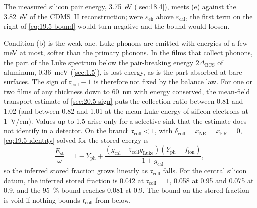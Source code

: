 The measured silicon pair energy, \SI{3.75}{eV} (\cref{sec:18.4}), meets (e) against the \SI{3.82}{eV} of the CDMS~II reconstruction; were $\varepsilon_{\mathrm{eh}}$ above $\varepsilon_{\mathrm{cal}}$, the first term on the right of \cref{eq:19.5-bound} would turn negative and the bound would loosen.

Condition (b) is the weak one. Luke phonons are emitted with energies of a few meV at most, softer than the primary phonons. In the films that collect phonons, the part of the Luke spectrum below the pair-breaking energy $2\Delta_{\mathrm{BCS}}$ of aluminum, \SI{0.36}{meV} (\cref{sec:1.5}), is lost energy, as is the part absorbed at bare surfaces. The sign of $\mathfrak{r}_{\mathrm{coll}} - 1$ is therefore not fixed by the balance law. For one or two films of any thickness down to \SI{60}{nm} with energy conserved, the mean-field transport estimate of \cref{sec:20.5-sign} puts the collection ratio between 0.81 and 1.02 (and between 0.82 and 1.01 at the mean Luke energy of silicon electrons at \SI{1}{V/cm}). Values up to 1.5 arise only for a selective sink that the estimate does not identify in a detector. On the branch $\mathfrak{r}_{\mathrm{coll}} < 1$, with $\delta_{\mathrm{coll}} = x_{\mathrm{NR}} = x_{\mathrm{ER}} = 0$, \cref{eq:19.5-identity} solved for the stored energy is
\begin{equation}
  \frac{E_{\mathrm{st}}}{\omega} = 1 - Y_{\mathrm{ph}} + \frac{(g_{\mathrm{cal}} - \mathfrak{r}_{\mathrm{coll}}g_{\mathrm{Luke}})(Y_{\mathrm{ph}} - f_{\mathrm{ion}})}{1 + g_{\mathrm{cal}}} ,
  \label{eq:19.5-widen}
\end{equation}
so the inferred stored fraction grows linearly as $\mathfrak{r}_{\mathrm{coll}}$ falls. For the central silicon datum, the inferred stored fraction is 0.042 at $\mathfrak{r}_{\mathrm{coll}} = 1$, 0.058 at 0.95 and 0.075 at 0.9, and the \SI{95}{\percent} bound reaches 0.081 at 0.9. The bound on the stored fraction is void if nothing bounds $\mathfrak{r}_{\mathrm{coll}}$ from below.

